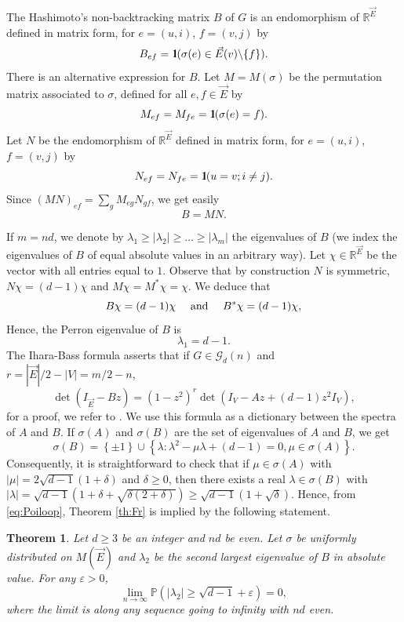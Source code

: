 \documentclass[11pt]{article}
\newtheorem{theorem}[lemma]{Theorem}
\newcommand{\dP}{\mathbb{P}}
\newcommand{\dR}{\mathbb {R}}
\newcommand{\cG}{\mathcal {G}}
\newcommand{\BRA}[1]{{{\left\{#1\right\}}}}
\newcommand{\PAR}[1]{{{\left(#1\right)}}} %
\newcommand{\1}{1\!\!{\sf I}}\newcommand{\IND}{\1}
\newcommand{\veps}{\varepsilon}
\newcommand{\si}{\sigma}
\begin{document}
The Hashimoto's non-backtracking matrix $B$ of $G$ is an endomorphism of $\dR^{\vec E}$ defined in matrix form, for $e = (u,i)$, $f = (v,j)$ by
$$
B_{ef} = \IND ( \si (e) \in \vec E(v) \backslash \{ f \} ). 
$$
There is an alternative expression for $B$. Let $M = M(\sigma)$ be the permutation matrix associated to $\sigma$, defined for all $e, f \in \vec E$ by
\begin{equation}\label{eq:defM}
M_{e f} = M_ {f e} = \IND ( \sigma(e) =  f).
\end{equation}
Let $N$ be the endomorphism of $\dR^{\vec E}$ defined in matrix form, for $e = (u,i)$, $f = (v,j)$ by 
\begin{equation}\label{eq:defN}
N_{e f}  = N_{fe} = \IND ( u = v ; i \ne j).
\end{equation}
Since $(MN)_{ef} = \sum_g M_{eg} N_{gf}$, we get easily
\begin{equation} \label{eq:defBMN}
B = M N.
\end{equation}

If $m = nd$, we denote by $\lambda_1 \geq |\lambda_2| \geq \ldots \geq |\lambda_m|$ the eigenvalues of $B$ (we index the eigenvalues of $B$ of equal absolute values in an arbitrary way). Let $\chi\in \dR^{\vec E}$ be the vector with all entries equal to $1$. Observe that by construction $N$ is symmetric, $N \chi = (d-1) \chi$ and $M \chi = M^* \chi = \chi$. We deduce that 
\begin{equation}\label{eq:Perron}
B \chi= (d-1) \chi \quad \hbox{ and } \quad B^* \chi= (d-1) \chi, 
\end{equation} 
Hence, the Perron eigenvalue of $B$ is
$$
\lambda_1 = d-1.
$$
The Ihara-Bass formula asserts that if $G \in \cG_d(n)$ and $r= |\vec E| / 2 - |V| =  m / 2 - n$, 
\begin{equation}\label{eq:IharaBass}
\det( I_{\vec E} - B z ) = ( 1  - z^2) ^{r} \det(  I_V - A z + (d-1)z ^2 I_V ), 
\end{equation}
for a proof, we refer to \cite{MR1749978,MR2768284}. We use this formula as a dictionary between the spectra of $A$ and $B$. If $\si(A)$ and $\si(B)$ are the set of eigenvalues of $A$ and $B$, we get 
\begin{equation*}\label{eq:rosetta}
\si(B) = \BRA{\pm 1} \cup \BRA{ \lambda : \lambda^2 - \mu \lambda + ( d-1) = 0 , \mu \in \sigma(A) }.
\end{equation*}
Consequently, it is straightforward to check that if $\mu \in \sigma(A)$ with $|\mu| = 2 \sqrt{d-1} (1+\delta)$ and $\delta \geq 0$, then there exists a real $ \lambda \in \sigma(B)$ with $|\lambda| = \sqrt{d-1} ( 1 + \delta + \sqrt{ \delta ( 2 + \delta)}) \geq \sqrt{d-1} (1 + \sqrt\delta)$.  Hence,  from \eqref{eq:Poiloop}, Theorem \ref{th:Fr} is implied by the following statement.
\begin{theorem}\label{th:FrNB}
Let  $d \geq 3$ be an integer and $nd$ be even. Let $\si$ be uniformly distributed on $M(\vec E)$ and $\lambda_2$ be the second largest eigenvalue of $B$ in absolute value. For any $\veps >0$, 
$$
\lim_{n \to \infty} \dP \PAR{| \lambda_2 | \geq \sqrt{d-1} + \veps }= 0,
$$
where the limit is along any sequence going to infinity with $nd$ even.
\end{theorem}
\end{document}

